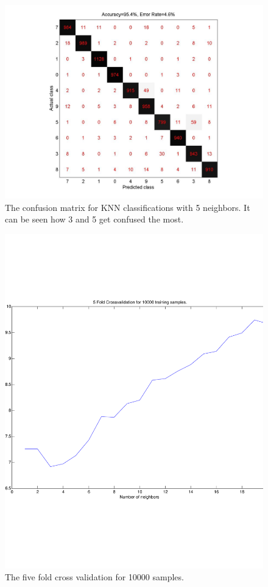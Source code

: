 \begin{figure}[H]
\centering
\includegraphics[width=\linewidth]{code/confusm_k5}
\caption{The confusion matrix for KNN classifications with 5 neighbors. It can be seen how 3 and 5 get confused the most.\label{fig:knn}}
\end{figure}
\begin{figure}[H]
\centering
\includegraphics[width=\linewidth]{code/5fold_knn_10000samples}
\caption{The five fold cross validation for 10000 samples.\label{fig:knn_small}}
\end{figure}
